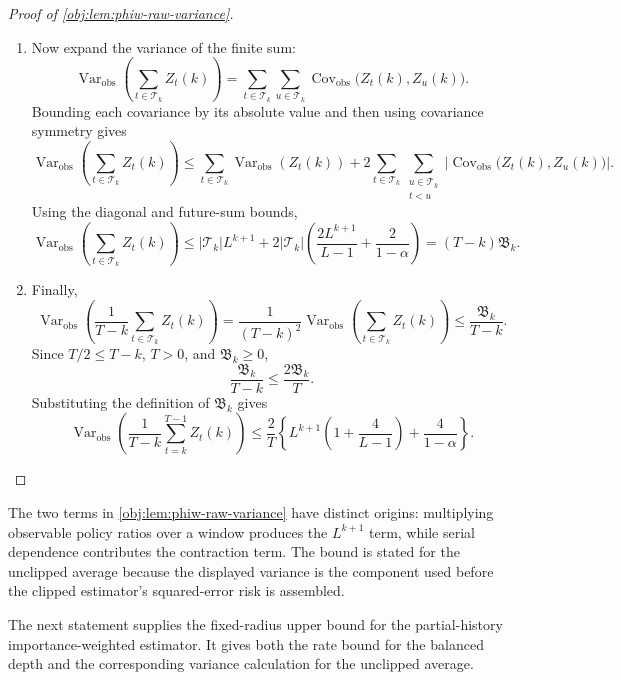 \documentclass[11pt]{article}
\begin{document}
\begin{proof}[Proof of \cref{obj:lem:phiw-raw-variance}]
\begin{enumerate}
\item
Now expand the variance of the finite sum:
\[
\operatorname{Var}_{\mathrm{obs}}\!\left(\sum_{t\in\mathscr T_k}Z_t(k)\right)
=
\sum_{t\in\mathscr T_k}\sum_{u\in\mathscr T_k}
\operatorname{Cov}_{\mathrm{obs}}\bigl(Z_t(k),Z_u(k)\bigr).
\]
Bounding each covariance by its absolute value and then using covariance symmetry gives
\[
\operatorname{Var}_{\mathrm{obs}}\!\left(\sum_{t\in\mathscr T_k}Z_t(k)\right)
\le
\sum_{t\in\mathscr T_k}\operatorname{Var}_{\mathrm{obs}}(Z_t(k))
+
2\sum_{t\in\mathscr T_k}
\sum_{\substack{u\in\mathscr T_k\\ t<u}}
\left|\operatorname{Cov}_{\mathrm{obs}}\bigl(Z_t(k),Z_u(k)\bigr)\right|.
\]
Using the diagonal and future-sum bounds,
\[
\operatorname{Var}_{\mathrm{obs}}\!\left(\sum_{t\in\mathscr T_k}Z_t(k)\right)
\le
|\mathscr T_k|L^{k+1}
+
2|\mathscr T_k|
\left(
\frac{2L^{k+1}}{L-1}
+
\frac{2}{1-\alpha}
\right)
=
(T-k)\mathfrak B_k.
\]

\item
Finally,
\[
\operatorname{Var}_{\mathrm{obs}}\!\left(
\frac{1}{T-k}\sum_{t\in\mathscr T_k}Z_t(k)
\right)
=
\frac{1}{(T-k)^2}
\operatorname{Var}_{\mathrm{obs}}\!\left(\sum_{t\in\mathscr T_k}Z_t(k)\right)
\le
\frac{\mathfrak B_k}{T-k}.
\]
Since \(T/2\le T-k\), \(T>0\), and \(\mathfrak B_k\ge0\),
\[
\frac{\mathfrak B_k}{T-k}
\le
\frac{2\mathfrak B_k}{T}.
\]
Substituting the definition of \(\mathfrak B_k\) gives
\[
\operatorname{Var}_{\mathrm{obs}}\!\left(\frac{1}{T-k}\sum_{t=k}^{T-1} Z_t(k)\right)
\le
\frac{2}{T}\left\{
L^{k+1}\left(1+\frac{4}{L-1}\right)
+
\frac{4}{1-\alpha}
\right\}.
\]
\end{enumerate}
\end{proof}

The two terms in \cref{obj:lem:phiw-raw-variance} have distinct origins: multiplying observable policy ratios over a window produces the \(L^{k+1}\) term, while serial dependence contributes the contraction term. The bound is stated for the unclipped average because the displayed variance is the component used before the clipped estimator's squared-error risk is assembled.

The next statement supplies the fixed-radius upper bound for the partial-history importance-weighted estimator. It gives both the rate bound for the balanced depth and the corresponding variance calculation for the unclipped average.
\end{document}

